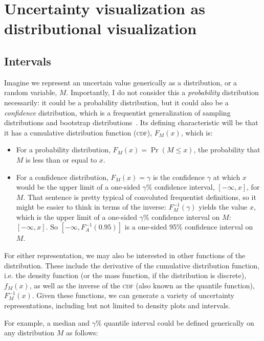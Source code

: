 \documentclass[journal]{vgtc}              %
\begin{document}
\section{Uncertainty visualization as\\distributional visualization}

\subsection{Intervals}

Imagine we represent an uncertain value generically as a distribution, or a random variable, $M$. Importantly, I do not consider this a \textit{probability} distribution necessarily: it could be a probability distribution, but it could also be a \textit{confidence} distribution, which is a frequentist generalization of sampling distributions and bootstrap distributions~\cite{xie2013confidence}. Its defining characteristic will be that it has a cumulative distribution function (\textsc{cdf}), $F_M(x)$, which is:
\begin{itemize}
    \item For a probability distribution, $F_M(x) = \Pr(M \le x)$, the probability that $M$ is less than or equal to $x$.
    \item   For a confidence distribution, $F_M(x) = \gamma$  is the confidence $\gamma$ at which $x$ would be the upper limit of a one-sided $\gamma\%$ confidence interval, $[-\infty, x]$, for $M$. That sentence is pretty typical of convoluted frequentist definitions, so it might be easier to think in terms of the inverse: $F_M^{-1}(\gamma)$ yields the value $x$, which is the upper limit of a one-sided $\gamma\%$ confidence interval on $M$: $[-\infty,x]$. So $[-\infty, F_A^{-1}(0.95)]$ is a one-sided 95\% confidence interval on $M$.
\end{itemize}

For either representation, we may also be interested in other functions of the distribution. These include the derivative of the cumulative distribution function, i.e. the density function (or the mass function, if the distribution is discrete), $f_M(x)$, as well as the inverse of the \textsc{cdf} (also known as the quantile function), $F_M^{-1}(x)$. Given these functions, we can generate a variety of uncertainty representations, including but not limited to density plots and intervals.

For example, a median and $\gamma\%$ quantile interval could be defined generically on any distribution $M$ as follows:
\end{document}

